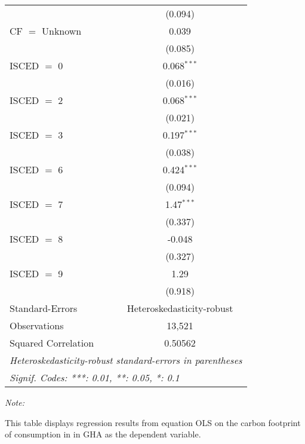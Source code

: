 \begin{table}[htbp!]
\begin{adjustbox}{width = 1\textwidth, max height = 0.95\textheight, center}
\begin{threeparttable}[b]
\begin{tabular}{lc}
                                & (0.094)\\   
            CF $=$ Unknown      & 0.039\\   
                                & (0.085)\\   
            ISCED $=$ 0         & 0.068$^{***}$\\   
                                & (0.016)\\   
            ISCED $=$ 2         & 0.068$^{***}$\\   
                                & (0.021)\\   
            ISCED $=$ 3         & 0.197$^{***}$\\   
                                & (0.038)\\   
            ISCED $=$ 6         & 0.424$^{***}$\\   
                                & (0.094)\\   
            ISCED $=$ 7         & 1.47$^{***}$\\   
                                & (0.337)\\   
            ISCED $=$ 8         & -0.048\\   
                                & (0.327)\\   
            ISCED $=$ 9         & 1.29\\   
                                & (0.918)\\   
            \midrule 
            Standard-Errors     & Heteroskedasticity-robust \\   
            Observations        & 13,521\\  
            Squared Correlation & 0.50562\\  
            \midrule \midrule
            \multicolumn{2}{l}{\emph{Heteroskedasticity-robust standard-errors in parentheses}}\\
            \multicolumn{2}{l}{\emph{Signif. Codes: ***: 0.01, **: 0.05, *: 0.1}}\\
         \end{tabular}
         
         \begin{tablenotes}\item \medskip \textit{Note:}
            \item This table displays regression results from equation OLS on the carbon footprint of consumption in  in GHA as the dependent variable.  
         \end{tablenotes}
      \end{threeparttable}
   \end{adjustbox}
\end{table}


